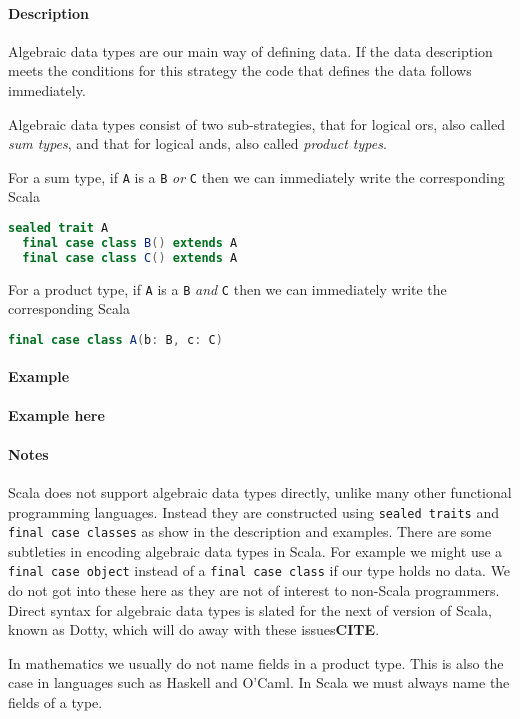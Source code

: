 \paragraph{Description} Algebraic data types are our main way of defining data. If the data description meets the conditions for this strategy the code that defines the data follows immediately.

Algebraic data types consist of two sub-strategies, that for logical ors, also called \emph{sum types}, and that for logical ands, also called \emph{product types}.

For a sum type, if \texttt{A} is a \texttt{B} \emph{or} \texttt{C} then we can immediately write the corresponding Scala

\begin{lstlisting}[language=scala]
  sealed trait A
  final case class B() extends A
  final case class C() extends A
\end{lstlisting}

For a product type, if \texttt{A} is a \texttt{B} \emph{and} \texttt{C} then we can immediately write the corresponding Scala

\begin{lstlisting}[language=scala]
  final case class A(b: B, c: C)
\end{lstlisting}

\paragraph{Example}
\textbf{Example here}

\paragraph{Notes} Scala does not support algebraic data types directly, unlike many other functional programming languages. Instead they are constructed using \texttt{sealed traits} and \texttt{final case classes} as show in the description and examples. There are some subtleties in encoding algebraic data types in Scala. For example we might use a \texttt{final case object} instead of a \texttt{final case class} if our type holds no data. We do not got into these here as they are not of interest to non-Scala programmers. Direct syntax for algebraic data types is slated for the next of version of Scala, known as Dotty, which will do away with these issues\textbf{CITE}.

In mathematics we usually do not name fields in a product type. This is also the case in languages such as Haskell and O'Caml. In Scala we must always name the fields of a type.


